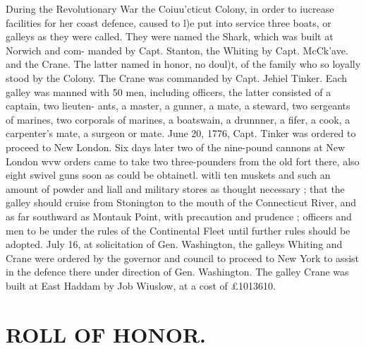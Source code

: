 \documentclass[oneside]{book}
\begin{document}
During the Revolutionary War the Coiuu'cticut Colony, in 
order to iucrease facilities for her coast defence, caused to l)e 
put into service three boats, or galleys as they were called. They 
were named the Shark, which was built at Norwich and com- 
manded by Capt. Stanton, the Whiting by Capt. McCk'ave. and 
the Crane. The latter named in honor, no doul)t, of the family 
who so loyally stood by the Colony. The Crane was commanded 
by Capt. Jehiel Tinker. Each galley was manned with 50 men, 
including officers, the latter consisted of a captain, two lieuten- 
ants, a master, a gunner, a mate, a steward, two sergeants of 
marines, two corporals of marines, a boatswain, a drunnner, a 
fifer, a cook, a carpenter's mate, a surgeon or mate. June 20, 
1776, Capt. Tinker was ordered to proceed to New London. Six 
days later two of the nine-pound cannons at New London wvw 
orders came to take two three-pounders from the old fort there, 
also eight swivel guns soon as could be obtainetl. witli ten 
muskets and such an amount of powder and liall and military 
stores as thought necessary ; that the galley should cruise from 
Stonington to the mouth of the Connecticut River, and as far 
southward as Montauk Point, with precaution and prudence ; 
officers and men to be under the rules of the Continental Fleet 
until further rules should be adopted. July 16, at solicitation of 
Gen. Washington, the galleys Whiting and Crane were ordered 
by the governor and council to proceed to New York to assist in 
the defence there under direction of Gen. Washington. The 
galley Crane was built at East Haddam by Job Wiuslow, at a 
cost of £1013610. 



\chapter{ROLL OF HONOR.}
\end{document}

